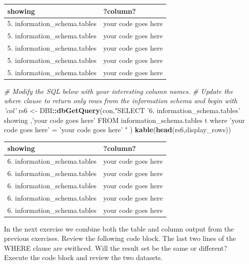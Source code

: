 \documentclass[]{book}
\newenvironment{Shaded}{\begin{snugshade}}{\end{snugshade}}
\newcommand{\CommentTok}[1]{\textcolor[rgb]{0.56,0.35,0.01}{\textit{#1}}}
\newcommand{\KeywordTok}[1]{\textcolor[rgb]{0.13,0.29,0.53}{\textbf{#1}}}
\newcommand{\NormalTok}[1]{#1}
\newcommand{\OperatorTok}[1]{\textcolor[rgb]{0.81,0.36,0.00}{\textbf{#1}}}
\newcommand{\StringTok}[1]{\textcolor[rgb]{0.31,0.60,0.02}{#1}}
\theoremstyle{definition}
\theoremstyle{definition}
\theoremstyle{definition}
\theoremstyle{remark}
\begin{document}
\begin{tabular}{l|l}
\hline
showing & ?column?\\
\hline
5. information\_schema.tables & your code goes here\\
\hline
5. information\_schema.tables & your code goes here\\
\hline
5. information\_schema.tables & your code goes here\\
\hline
5. information\_schema.tables & your code goes here\\
\hline
5. information\_schema.tables & your code goes here\\
\hline
\end{tabular}

\begin{Shaded}
\begin{Highlighting}[]
\CommentTok{# Modify the SQL below with your interesting column names.}
\CommentTok{# Update the where clause to return only rows from the information schema and begin with 'col'}
\NormalTok{rs6 <-}\StringTok{ }\NormalTok{DBI}\OperatorTok{::}\KeywordTok{dbGetQuery}\NormalTok{(con,}\StringTok{"SELECT '6. information_schema.tables' showing}
\StringTok{                                  ,'your code goes here' }
\StringTok{                              FROM information_schema.tables t}
\StringTok{                             where 'your code goes here' = 'your code goes here'}
\StringTok{                            "}
\NormalTok{                      )}
\KeywordTok{kable}\NormalTok{(}\KeywordTok{head}\NormalTok{(rs6,display_rows))}
\end{Highlighting}
\end{Shaded}

\begin{tabular}{l|l}
\hline
showing & ?column?\\
\hline
6. information\_schema.tables & your code goes here\\
\hline
6. information\_schema.tables & your code goes here\\
\hline
6. information\_schema.tables & your code goes here\\
\hline
6. information\_schema.tables & your code goes here\\
\hline
6. information\_schema.tables & your code goes here\\
\hline
\end{tabular}

In the next exercise we combine both the table and column output from
the previous exercises. Review the following code block. The last two
lines of the WHERE clause are swithced. Will the result set be the same
or different? Execute the code block and review the two datasets.
\end{document}
